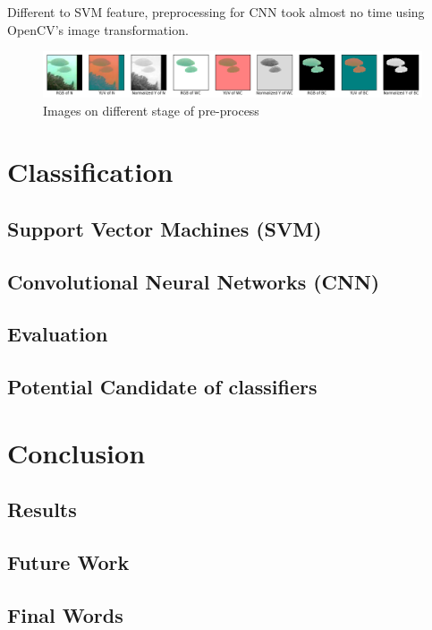 \documentclass[bsc,logo,twoside,fullspacing,parskip]{infthesis}
\begin{document}
Different to SVM feature, preprocessing for CNN took almost no time using OpenCV's image transformation.

\begin{figure}[!b]
\centering
    \includegraphics[scale=0.4]{graph/imagepre.png}
    \caption{Images on different stage of pre-process}
    \label{fig:imageprepro}
\end{figure}

\chapter{Classification}

\section{Support Vector Machines (SVM)}
\section{Convolutional Neural Networks (CNN)}
\section{Evaluation}
\section{Potential Candidate of classifiers}

\chapter{Conclusion}
\section{Results}
\section{Future Work}
\section{Final Words}




\end{document}
